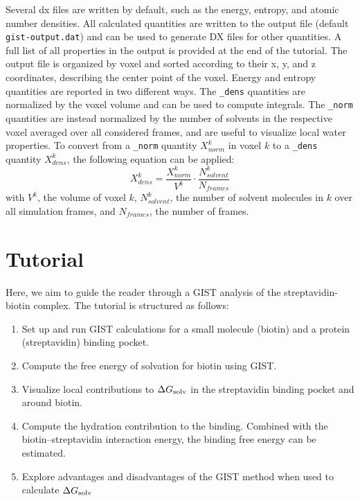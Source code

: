 \documentclass[9pt,tutorial]{livecoms}
\newcommand{\dgsolv}{\Delta G_\textup{solv}}
\newcommand\inlinecode{\texttt}
\begin{document}
Several dx files are written by default, such as the energy, entropy, and atomic number densities.
All calculated quantities are written to the output file (default \inlinecode{gist-output.dat}) and can be used to generate DX files for other quantities.
A full list of all properties in the output is provided at the end of the tutorial. 
The output file is organized by voxel and sorted according to their x, y, and z coordinates, describing the center point of the voxel.
Energy and entropy quantities are reported in two different ways.
The \inlinecode{\_dens} quantities are normalized by the voxel volume and can be used to compute integrals.
The \inlinecode{\_norm} quantities are instead normalized by the number of solvents in the respective voxel averaged over all considered frames, and are useful to visualize local water properties.
To convert from a \inlinecode{\_norm} quantity $X^k_{norm}$ in voxel $k$ to a \inlinecode{\_dens} quantity $X^k_{dens}$, the following equation can be applied:
\begin{equation}
	X^k_{dens} = \frac{X^k_{norm}}{V^k} \cdot \frac{N^k_{solvent}}{N_{frames}}
\end{equation}
with $V^k$, the volume of voxel $k$, $N^k_{solvent}$, the number of solvent molecules in $k$ over all simulation frames, and $N_{frames}$, the number of frames.

\section{Tutorial}
Here, we aim to guide the reader through a GIST analysis of the streptavidin-biotin complex.
The tutorial is structured as follows:
\begin{enumerate}
	\item Set up and run GIST calculations for a small molecule (biotin) and a protein (streptavidin) binding pocket.
	\item Compute the free energy of solvation for biotin using GIST.
	\item Visualize local contributions to $\dgsolv$ in the streptavidin binding pocket and around biotin.
	\item Compute the hydration contribution to the binding. Combined with the biotin--streptavidin interaction energy, the binding free energy can be estimated.
	\item Explore advantages and disadvantages of the GIST method when used to calculate  $\dgsolv$
\end{enumerate}
\end{document}

